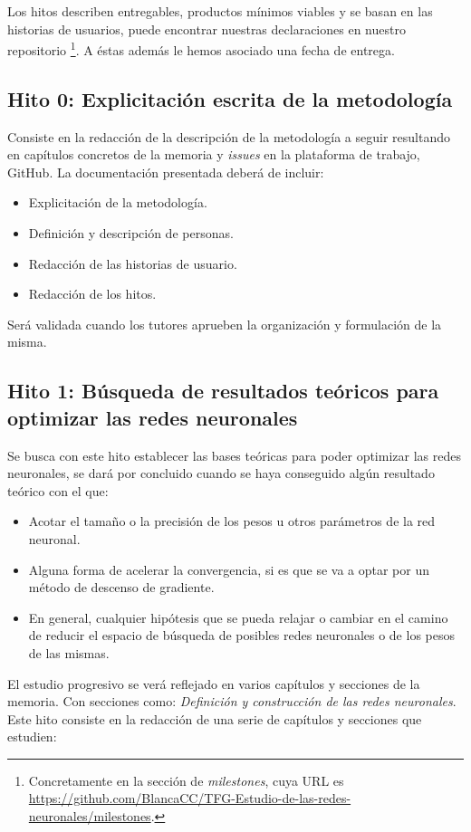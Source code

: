 Los hitos describen entregables, productos mínimos viables y se basan en las historias de usuarios,
puede encontrar nuestras declaraciones en nuestro repositorio \footnote{Concretamente en la sección de \textit{milestones}, cuya URL es \url{https://github.com/BlancaCC/TFG-Estudio-de-las-redes-neuronales/milestones}.}. 
A éstas además le hemos asociado una fecha de entrega. 


\subsection*{Hito 0: Explicitación escrita de la metodología} 
Consiste en la redacción de la descripción de la metodología a seguir resultando en capítulos concretos de la memoria 
y \textit{issues} en la plataforma de trabajo, GitHub.  
La documentación presentada deberá de incluir: 
\begin{itemize}
    \item Explicitación de la metodología. 
    \item Definición y descripción de personas.
    \item Redacción de las historias de usuario.
    \item Redacción de los hitos.
\end{itemize}
Será validada cuando los tutores aprueben la organización y formulación de la misma.


\subsection*{Hito 1: Búsqueda de resultados teóricos para optimizar  las redes neuronales}

Se busca con este hito establecer las bases teóricas para poder optimizar las redes neuronales, se dará por concluido cuando se haya conseguido algún resultado teórico con el que:
\begin{itemize}
    \item Acotar el tamaño o la precisión de los pesos u otros parámetros de la red neuronal.
    \item Alguna forma de acelerar la convergencia, si es que se va a optar por un método de descenso de gradiente.
    \item En general, cualquier hipótesis que se pueda relajar o cambiar en el camino de reducir el espacio de búsqueda de posibles redes neuronales o de los pesos de las mismas.
\end{itemize}

El estudio progresivo se verá reflejado en varios capítulos y secciones de la memoria. Con secciones como: 
\textit{Definición  y construcción de las redes neuronales}. 
Este hito consiste en la redacción de una serie de capítulos y secciones 
que estudien: 

